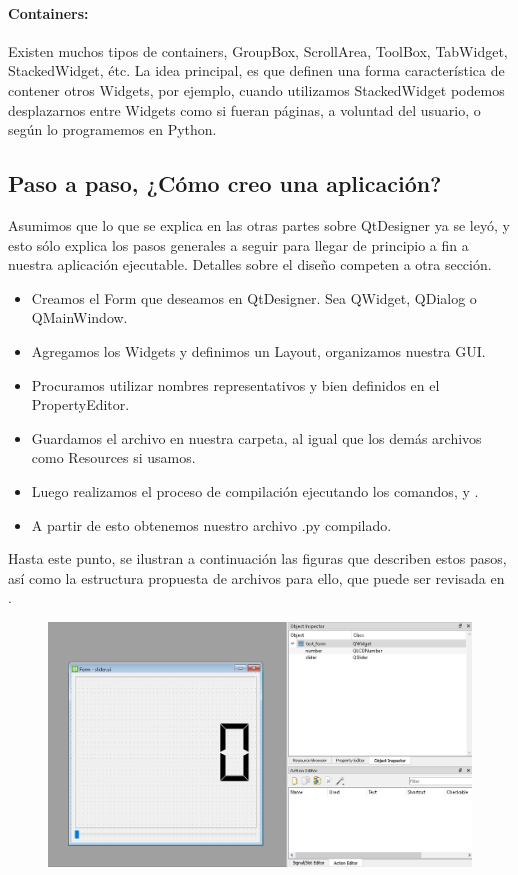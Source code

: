 \paragraph{Containers:} Existen muchos tipos de containers, GroupBox, ScrollArea, ToolBox, TabWidget, StackedWidget, \'etc. La idea principal,
es que definen una forma caracter\'istica de contener otros Widgets, por ejemplo, cuando utilizamos StackedWidget podemos desplazarnos entre Widgets
como si fueran p\'aginas, a voluntad del usuario, o seg\'un lo programemos en Python.

\subsection{Paso a paso, ¿C\'omo creo una aplicaci\'on?}
Asumimos que lo que se explica en las otras partes sobre QtDesigner ya se ley\'o, y esto s\'olo explica los pasos generales a seguir
para llegar de principio a fin a nuestra aplicaci\'on ejecutable. Detalles sobre el dise\~no competen a otra secci\'on.

\begin{itemize}
    \item Creamos el Form que deseamos en QtDesigner. Sea QWidget, QDialog o QMainWindow.
    \item Agregamos los Widgets y definimos un Layout, organizamos nuestra GUI.
    \item Procuramos utilizar nombres representativos y bien definidos en el PropertyEditor.
    \item Guardamos el archivo en nuestra carpeta, al igual que los dem\'as archivos como Resources si usamos.
    \item Luego realizamos el proceso de compilaci\'on ejecutando los comandos,  y .
    \item A partir de esto obtenemos nuestro archivo .py compilado.
\end{itemize}

Hasta este punto, se ilustran a continuaci\'on las figuras que describen estos pasos, as\'i como la estructura propuesta de archivos para ello,
que puede ser revisada en .

\begin{figure}[H]
    \centering
    \includegraphics[scale=0.4]{imagenes/qtdesigner/qt_steps.PNG}
\end{figure}

